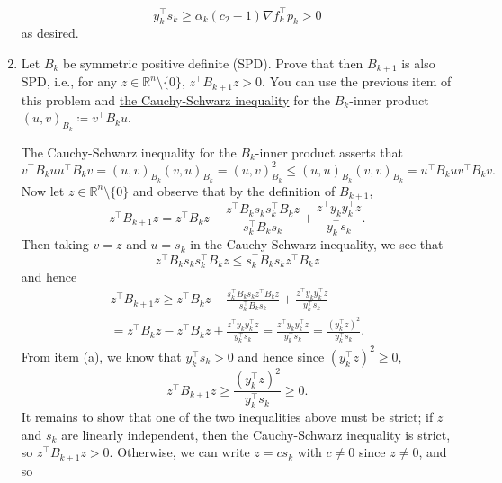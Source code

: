 \documentclass{../kin_math}
\begin{document}
\begin{questions}
\begin{enumerate}
\begin{solution}
      \begin{equation*}
        y_k^\top s_k \geq \alpha_k (c_2 - 1) \nabla f_k^\top p_k > 0
      \end{equation*}
      as desired.
    \end{solution}
    \item Let $B_k$ be symmetric positive definite (SPD). Prove that then $B_{k + 1}$ is also SPD, i.e., for any $z \in \mathbb{R}^n \setminus \{0\}$, $z^\top B_{k + 1} z > 0$. You can use the previous item of this problem and \href{https://en.wikipedia.org/wiki/Cauchy%E2%80%93Schwarz_inequality}{the Cauchy-Schwarz inequality} for the $B_k$-inner product $(u, v)_{B_k} \coloneqq v^\top B_k u$.
    \begin{solution}
      The Cauchy-Schwarz inequality for the $B_k$-inner product asserts that
      \begin{equation*}
        v^\top B_k u u^\top B_k v = (u, v)_{B_k} (v, u)_{B_k} = (u, v)_{B_k}^2 \leq (u, u)_{B_k} (v, v)_{B_k} = u^\top B_k u v^\top B_k v.
      \end{equation*}
      Now let $z \in \mathbb{R}^n \setminus \{0\}$ and observe that by the definition of $B_{k + 1}$,
      \begin{equation*}
        z^\top B_{k + 1} z = z^\top B_k z - \frac{z^\top B_k s_k s_k^\top B_k z}{s_k^\top B_k s_k} + \frac{z^\top  y_k y_k^\top z}{y_k^\top s_k}.
      \end{equation*}
      Then taking $v = z$ and $u = s_k$ in the Cauchy-Schwarz inequality, we see that
      \begin{equation*}
        z^\top B_k s_k s_k^\top B_k z \leq s_k^\top B_k s_k z^\top B_k z
      \end{equation*}
      and hence
      \begin{multline*}
        z^\top B_{k + 1} z \geq z^\top B_k z - \frac{s_k^\top B_k s_k z^\top B_k z}{s_k^\top B_k s_k} + \frac{z^\top  y_k y_k^\top z}{y_k^\top s_k} \\
        = z^\top B_k z - z^\top B_k z + \frac{z^\top  y_k y_k^\top z}{y_k^\top s_k} = \frac{z^\top  y_k y_k^\top z}{y_k^\top s_k} = \frac{(y_k^\top z)^2}{y_k^\top s_k}.
      \end{multline*}
      From item (a), we know that $y_k^\top s_k > 0$ and hence since $(y_k^\top z)^2 \geq 0$,
      \begin{equation*}
        z^\top B_{k + 1} z \geq \frac{(y_k^\top z)^2}{y_k^\top s_k} \geq 0.
      \end{equation*}
      It remains to show that one of the two inequalities above must be strict; if $z$ and $s_k$ are linearly independent, then the Cauchy-Schwarz inequality is strict, so $z^\top B_{k + 1} z > 0$. Otherwise, we can write $z = c s_k$ with $c \neq 0$ since $z \neq 0$, and so

\end{solution}
\end{enumerate}
\end{questions}
\end{document}

